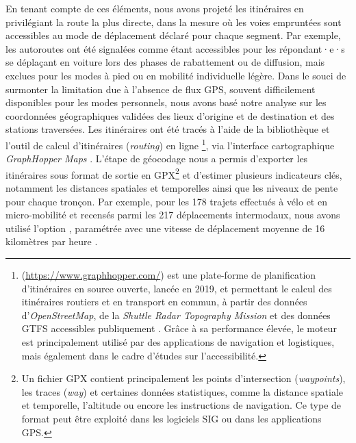 \begin{refsegment}
En tenant compte de ces éléments, nous avons projeté les itinéraires en privilégiant la route la plus directe, dans la mesure où les voies empruntées sont accessibles au mode de déplacement déclaré pour chaque segment. Par exemple, les autoroutes ont été signalées comme étant accessibles pour les répondant·e·s se déplaçant en voiture lors des phases de rabattement ou de diffusion, mais exclues pour les modes à pied ou en mobilité individuelle légère. Dans le souci de surmonter la limitation due à l'absence de flux \acrshort{GPS}, souvent difficilement disponibles pour les modes personnels, nous avons basé notre analyse sur les coordonnées géographiques validées des lieux d’origine et de destination et des stations traversées. Les itinéraires ont été tracés à l’aide de la bibliothèque et l’outil de calcul d'itinéraires (\textsl{routing}) en ligne \footnote{
     (\url{https://www.graphhopper.com/}) est une plate-forme de planification d'itinéraires en source ouverte, lancée en 2019, et permettant le calcul des itinéraires routiers et en transport en commun, à partir des données d’\textsl{OpenStreetMap}, de la \textsl{Shuttle Radar Topography Mission} et des données \acrshort{GTFS} accessibles publiquement \textcolor{blue}{\autocite{graphhopper_graphhopper_2017}}. Grâce à sa performance élevée, le moteur est principalement utilisé par des applications de navigation et logistiques, mais également dans le cadre d'études sur l'accessibilité.
}, via l’interface cartographique \textsl{GraphHopper Maps} \textcolor{blue}{\autocite{graphhopper_graphhopper_2017}}. L'étape de géocodage nous a permis d’exporter les itinéraires sous format de sortie en \acrfull{GPX}\footnote{
    Un fichier \acrfull{GPX} contient principalement les points d'intersection (\textsl{waypoints}), les traces (\textsl{way}) et certaines données statistiques, comme la distance spatiale et temporelle, l'altitude ou encore les instructions de navigation. Ce type de format peut être exploité dans les logiciels \acrshort{SIG} ou dans les applications \acrshort{GPS}.
} et d’estimer plusieurs indicateurs clés, notamment les distances spatiales et temporelles ainsi que les niveaux de pente pour chaque tronçon. Par exemple, pour les 178 trajets effectués à vélo et en micro-mobilité et recensés parmi les 217 déplacements intermodaux, nous avons utilisé l’option , paramétrée avec une vitesse de déplacement moyenne de 16 kilomètres par heure \textcolor{blue}{\autocite[18]{sebban_complementarite_2003}}.%


\end{refsegment}
